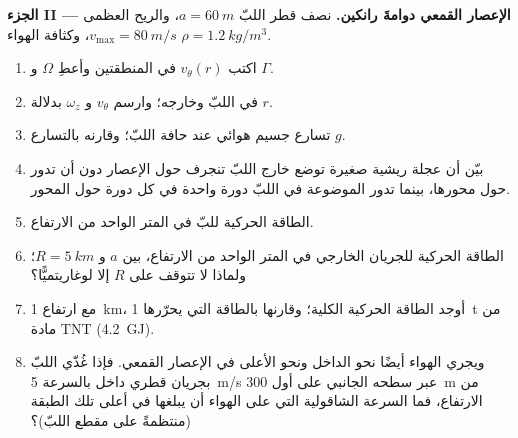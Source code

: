 \begin{problem}
\medskip
\noindent\textbf{الجزء II --- الإعصار القمعي دوامةَ رانكين.}
نصف قطر اللبّ $a = \qty{60}{m}$، والريح العظمى $v_{\max} = \qty{80}{m/s}$،
وكثافة الهواء $\rho = \qty{1.2}{kg/m^3}$.
\begin{enumerate}[resume]
  \item اكتب $v_\theta(r)$ في المنطقتين وأعطِ $\Omega$ و $\Gamma$.
  \item {} في اللبّ وخارجه؛ وارسم $v_\theta$ و $\omega_z$
        بدلالة $r$.
  \item تسارع جسيم هوائي عند حافة اللبّ؛ وقارنه بالتسارع $g$.
  \item بيّن أن عجلة ريشية صغيرة توضع خارج اللبّ تنجرف حول
        الإعصار دون أن تدور حول محورها، بينما تدور الموضوعة في
        اللبّ دورة واحدة في كل دورة حول المحور.
  \item الطاقة الحركية للبّ في المتر الواحد من الارتفاع.
  \item الطاقة الحركية للجريان الخارجي في المتر الواحد من
        الارتفاع، بين $a$ و $R = \qty{5}{km}$؛ ولماذا لا تتوقف على
        $R$ إلا لوغاريتميًّا؟
  \item مع ارتفاع \qty{1}{km}، أوجد الطاقة الحركية الكلية؛
        وقارنها بالطاقة التي يحرّرها \qty{1}{t} من مادة TNT (\qty{4.2}{GJ}).
  \item ويجري الهواء أيضًا نحو الداخل ونحو الأعلى في الإعصار
        القمعي. فإذا غُذّي اللبّ بجريان قطري داخل بالسرعة
        \qty{5}{m/s} عبر سطحه الجانبي على أول \qty{300}{m} من
        الارتفاع، فما السرعة الشاقولية التي على الهواء أن
        يبلغها في أعلى تلك الطبقة (منتظمةً على مقطع اللبّ)؟
\end{enumerate}


\end{problem}
